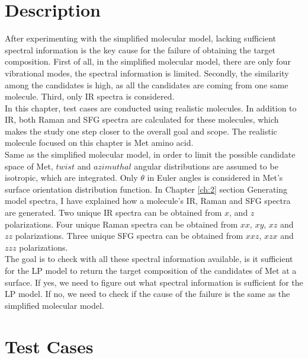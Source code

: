  \label{ch:4}
\section{Description}

After experimenting with the simplified molecular model, lacking sufficient spectral information is the key cause for the failure of obtaining the target composition. First of all, in the simplified molecular model, there are only four vibrational modes, the spectral information is limited. Secondly, the similarity among the candidates is high, as all the candidates are coming from one same molecule. Third, only IR spectra is considered. \\

In this chapter, test cases are conducted using realistic molecules. In addition to IR, both Raman and SFG spectra are calculated for these molecules, which makes the study one step closer to the overall goal and scope. The realistic molecule focused on this chapter is Met amino acid. \\

Same as the simplified molecular model, in order to limit the possible candidate space of Met, $twist$ and $azimuthal$ angular distributions are assumed to be isotropic, which are integrated. Only $\theta$ in Euler angles is considered in Met's surface orientation distribution function. In Chapter \ref{ch:2} section Generating model spectra, I have explained how a molecule's IR, Raman and SFG spectra are generated. Two unique IR spectra can be obtained from $x$, and $z$ polarizations. Four unique Raman spectra can be obtained from $xx$, $xy$, $xz$ and $zz$ polarizations. Three unique SFG spectra can be obtained from $xxz$, $xzx$ and $zzz$ polarizations.\\

The goal is to check with all these spectral information available, is it sufficient for the LP model to return the target composition of the candidates of Met at a surface. If yes, we need to figure out what spectral information is sufficient for the LP model. If no, we need to check if the cause of the failure is the same as the simplified molecular model. \\

\section{Test Cases}

